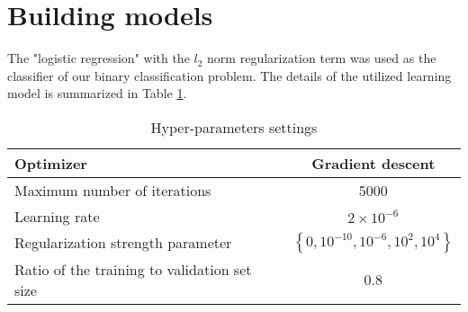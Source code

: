 \documentclass[10pt,conference,compsocconf]{IEEEtran}
\begin{document}
\vspace{-10pt}
\section{Building models}
\label{sec:building_models}
The "logistic regression" with the $l_{2}$ norm regularization term was used as the classifier of our binary classification problem. The details of the utilized learning model is summarized in Table \ref{tab:Hyper-parameters settings}.

\begin{table}[h]
\caption{Hyper-parameters settings}
\label{tab:Hyper-parameters settings}
\begin{center}
\begin{tabular}{l|c}
\hline
Optimizer                                     & Gradient descent                                             \\ \hline
Maximum number of iterations                  & 5000                                                         \\ \hline
Learning rate                                 & $2 \times 10 ^{-6}$                                          \\ \hline
Regularization strength parameter & $\left \{0, 10 ^{-10}, 10 ^{-6}, 10 ^{2}, 10 ^{4} \right \}$ \\ \hline
Ratio of the training to validation set size      & 0.8                                                          \\ \hline
\end{tabular}
\end{center}
\end{table}
\end{document}
